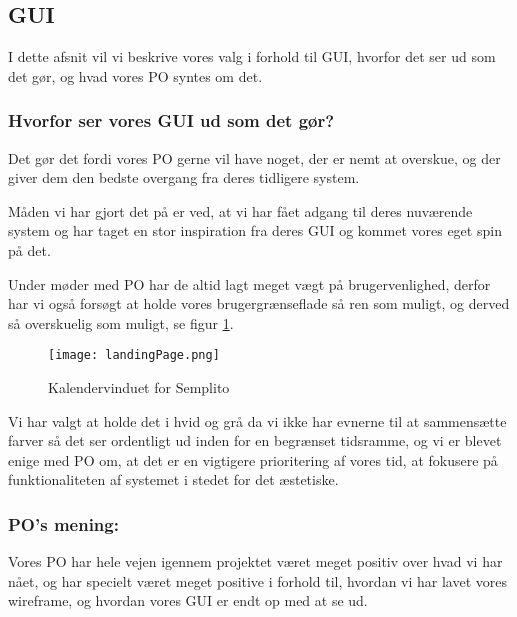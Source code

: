 \subsection{GUI}
\label{GUI}
I dette afsnit vil vi beskrive vores valg i forhold til GUI, hvorfor det ser ud som det gør, og hvad vores PO syntes om det.

\subsubsection{Hvorfor ser vores GUI ud som det gør?}
Det gør det fordi vores PO gerne vil have noget, der er nemt at overskue, og der giver dem den bedste overgang fra deres tidligere system.

Måden vi har gjort det på er ved, at vi har fået adgang til deres nuværende system og har taget en stor inspiration fra deres GUI og kommet vores eget spin på det.

Under møder med PO har de altid lagt meget vægt på brugervenlighed, derfor har vi også forsøgt at holde vores brugergrænseflade så ren som muligt, og derved så overskuelig som muligt, se figur \ref{GUI:Screenshot}.

\begin{figure}[H]
    \caption{Kalendervinduet for Semplito}
    \centering
        \texttt{[image: landingPage.png]}
    \label{GUI:Screenshot}
\end{figure}

Vi har valgt at holde det i hvid og grå da vi ikke har evnerne til at sammensætte farver så det ser ordentligt ud inden for en begrænset tidsramme, og vi er blevet enige med PO om, at det er en vigtigere prioritering af vores tid, at fokusere på funktionaliteten af systemet i stedet for det æstetiske.

\subsubsection{PO's mening:}
Vores PO har hele vejen igennem projektet været meget positiv over hvad vi har nået, og har specielt været meget positive i forhold til, hvordan vi har lavet vores wireframe, og hvordan vores GUI er endt op med at se ud.